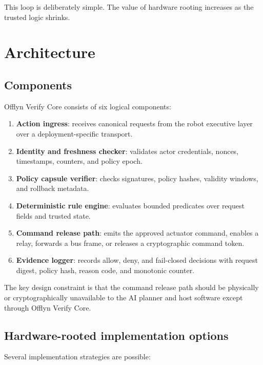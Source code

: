 \documentclass[10pt]{article}
\newcommand{\ovc}{Offlyn Verify Core\xspace}
\begin{document}
This loop is deliberately simple. The value of hardware rooting increases as the trusted logic shrinks.

\section{Architecture}

\subsection{Components}

\ovc consists of six logical components:

\begin{enumerate}[leftmargin=*]
  \item \textbf{Action ingress}: receives canonical requests from the robot executive layer over a deployment-specific transport.
  \item \textbf{Identity and freshness checker}: validates actor credentials, nonces, timestamps, counters, and policy epoch.
  \item \textbf{Policy capsule verifier}: checks signatures, policy hashes, validity windows, and rollback metadata.
  \item \textbf{Deterministic rule engine}: evaluates bounded predicates over request fields and trusted state.
  \item \textbf{Command release path}: emits the approved actuator command, enables a relay, forwards a bus frame, or releases a cryptographic command token.
  \item \textbf{Evidence logger}: records allow, deny, and fail-closed decisions with request digest, policy hash, reason code, and monotonic counter.
\end{enumerate}

The key design constraint is that the command release path should be physically or cryptographically unavailable to the AI planner and host software except through \ovc.

\subsection{Hardware-rooted implementation options}

Several implementation strategies are possible:
\end{document}
